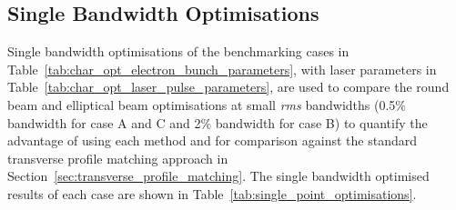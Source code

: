 \documentclass[../main.tex]{subfiles}
\begin{document}
\subsection{Single Bandwidth Optimisations}
\label{sec:single_bandwidth_optimisations}

Single bandwidth optimisations of the benchmarking cases in Table~\ref{tab:char_opt_electron_bunch_parameters}, with laser parameters in Table~\ref{tab:char_opt_laser_pulse_parameters}, are used to compare the round beam and elliptical beam optimisations at small \textit{rms} bandwidths (0.5\%  bandwidth for case A and C and 2\%  bandwidth for case B) to quantify the advantage of using each method and for comparison against the standard transverse profile matching approach in Section~\ref{sec:transverse_profile_matching}. The single bandwidth optimised results of each case are shown in Table~\ref{tab:single_point_optimisations}. 
\end{document}
